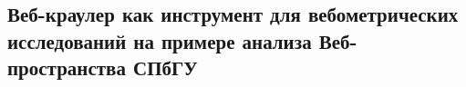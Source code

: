 \subsection{Веб-краулер как инструмент для вебометрических исследований на примере анализа Веб-пространства СПбГУ}\label{subsec:ch1/sec3/sub2}

%
%
%
